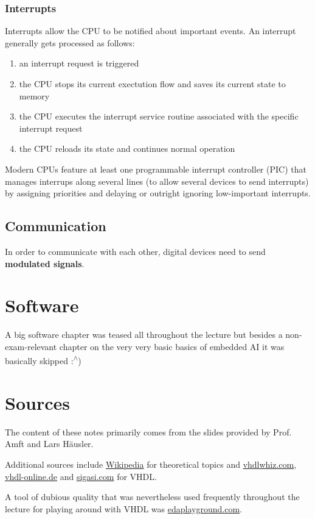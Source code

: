 \documentclass{report}
\newcommand{\tbf}{\textbf}
\newcommand*{\newpar}{\par\vspace{\baselineskip}\noindent} %
\begin{document}
\subsection{Interrupts}
Interrupts allow the CPU to be notified about important events. An interrupt generally gets processed as follows:
\begin{enumerate}
 \item an interrupt request is triggered
 \item the CPU stops its current exectution flow and saves its current state to memory
 \item the CPU executes the interrupt service routine associated with the specific interrupt request
 \item the CPU reloads its state and continues normal operation
\end{enumerate}
Modern CPUs feature at least one programmable interrupt controller (PIC) that manages interrups along several lines (to allow several devices to send interrupts) by assigning priorities and delaying or outright ignoring low-important interrupts.
%
\section{Communication}
In order to communicate with each other, digital devices need to send \tbf{modulated signals}.
\chapter{Software}
\thispagestyle{fancy}
A big software chapter was teased all throughout the lecture but besides a non-exam-relevant chapter on the very very basic basics of embedded AI it was basically skipped :\textsuperscript{$\wedge$})
%
\appendix
\chapter{Sources}
\thispagestyle{fancy}
The content of these notes primarily comes from the slides provided by Prof. Amft and Lars Häusler.
\newpar
Additional sources include \href{http://www.en.wikipedia.org}{Wikipedia} for theoretical topics and \href{http://www.vhdlwhiz.com}{vhdlwhiz.com}, \href{http://www.vhdl-online.de}{vhdl-online.de} and \href{https://www.sigasi.com/tech/}{sigasi.com} for VHDL.
\newpar
A tool of dubious quality that was nevertheless used frequently throughout the lecture for playing around with VHDL was \href{https://www.edaplayground.com}{edaplayground.com}.
\end{document}
